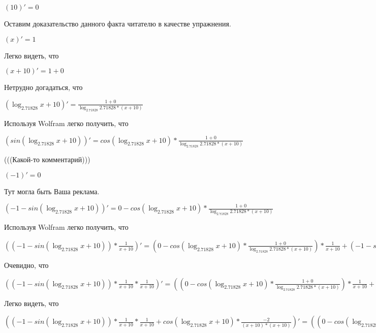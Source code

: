 \documentclass[12pt,a4paper,fleqn]{article}
\theoremstyle{definition}
\begin{document}
$( 10 )' =  0 $

Оставим доказательство данного факта читателю в качестве упражнения.

$( x )' =  1 $

Легко видеть, что

$( x  +  10 )' =  1  +  0 $

Нетрудно догадаться, что

$(\log_{ 2.71828 }{ x  +  10 })' = \frac{ 1  +  0 }{\log_{ 2.71828 }{ 2.71828 } * ( x  +  10 )}
$

Используя Wolfram легко получить, что

$(sin(\log_{ 2.71828 }{ x  +  10 }))' = cos(\log_{ 2.71828 }{ x  +  10 }) * \frac{ 1  +  0 }{\log_{ 2.71828 }{ 2.71828 } * ( x  +  10 )}
$

(((Какой-то комментарий)))

$( -1 )' =  0 $

Тут могла быть Ваша реклама.

$( -1  - sin(\log_{ 2.71828 }{ x  +  10 }))' =  0  - cos(\log_{ 2.71828 }{ x  +  10 }) * \frac{ 1  +  0 }{\log_{ 2.71828 }{ 2.71828 } * ( x  +  10 )}
$

Используя Wolfram легко получить, что

$(( -1  - sin(\log_{ 2.71828 }{ x  +  10 })) * \frac{ 1 }{ x  +  10 }
)' = ( 0  - cos(\log_{ 2.71828 }{ x  +  10 }) * \frac{ 1  +  0 }{\log_{ 2.71828 }{ 2.71828 } * ( x  +  10 )}
) * \frac{ 1 }{ x  +  10 }
 + ( -1  - sin(\log_{ 2.71828 }{ x  +  10 })) * \frac{ 0  * ( x  +  10 ) -  1  * ( 1  +  0 )}{( x  +  10 ) * ( x  +  10 )}
$

Очевидно, что

$(( -1  - sin(\log_{ 2.71828 }{ x  +  10 })) * \frac{ 1 }{ x  +  10 }
 * \frac{ 1 }{ x  +  10 }
)' = (( 0  - cos(\log_{ 2.71828 }{ x  +  10 }) * \frac{ 1  +  0 }{\log_{ 2.71828 }{ 2.71828 } * ( x  +  10 )}
) * \frac{ 1 }{ x  +  10 }
 + ( -1  - sin(\log_{ 2.71828 }{ x  +  10 })) * \frac{ 0  * ( x  +  10 ) -  1  * ( 1  +  0 )}{( x  +  10 ) * ( x  +  10 )}
) * \frac{ 1 }{ x  +  10 }
 + ( -1  - sin(\log_{ 2.71828 }{ x  +  10 })) * \frac{ 1 }{ x  +  10 }
 * \frac{ 0  * ( x  +  10 ) -  1  * ( 1  +  0 )}{( x  +  10 ) * ( x  +  10 )}
$

Легко видеть, что

$(( -1  - sin(\log_{ 2.71828 }{ x  +  10 })) * \frac{ 1 }{ x  +  10 }
 * \frac{ 1 }{ x  +  10 }
 + cos(\log_{ 2.71828 }{ x  +  10 }) * \frac{ -2 }{( x  +  10 ) * ( x  +  10 )}
)' = (( 0  - cos(\log_{ 2.71828 }{ x  +  10 }) * \frac{ 1  +  0 }{\log_{ 2.71828 }{ 2.71828 } * ( x  +  10 )}
) * \frac{ 1 }{ x  +  10 }
 + ( -1  - sin(\log_{ 2.71828 }{ x  +  10 })) * \frac{ 0  * ( x  +  10 ) -  1  * ( 1  +  0 )}{( x  +  10 ) * ( x  +  10 )}
) * \frac{ 1 }{ x  +  10 }
 + ( -1  - sin(\log_{ 2.71828 }{ x  +  10 })) * \frac{ 1 }{ x  +  10 }
 * \frac{ 0  * ( x  +  10 ) -  1  * ( 1  +  0 )}{( x  +  10 ) * ( x  +  10 )}
 + ( -1  - sin(\log_{ 2.71828 }{ x  +  10 })) * \frac{ 1  +  0 }{\log_{ 2.71828 }{ 2.71828 } * ( x  +  10 )}
 * \frac{ -2 }{( x  +  10 ) * ( x  +  10 )}
 + cos(\log_{ 2.71828 }{ x  +  10 }) * \frac{ 0  * ( x  +  10 ) * ( x  +  10 ) -  -2  * (( 1  +  0 ) * ( x  +  10 ) + ( x  +  10 ) * ( 1  +  0 ))}{( x  +  10 ) * ( x  +  10 ) * ( x  +  10 ) * ( x  +  10 )}
$
\end{document}
